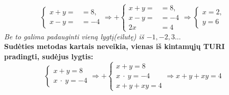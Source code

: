 \documentclass[fleqn]{article} %
\begin{document}
\begin{equation}
    \begin{cases}
        x + y = &= 8, \\
        x - y = &= -4
    \end{cases}
    \Rightarrow +
    \begin{cases}
        x + y = &= 8, \\
        x - y = &= -4 \\
        \hline
        2x &= 4 
    \end{cases}
    \Rightarrow
    \begin{cases}
        x = 2, \\
        y = 6
    \end{cases}
\end{equation}
\textit{Be to galima padauginti vieną lygtį(eilutę) iš $-1, -2, 3 \dots$} \\
\textbf{Sudėties metodas kartais neveikia, vienas iš kintamųjų TURI pradingti, sudėjus lygtis:}
\begin{equation}
    \begin{cases}
        x + y = 8 \\
        x\ \cdot\ y = -4  
    \end{cases}
    \Rightarrow +
    \begin{cases}
        x + y = 8 \\
        x\ \cdot\ y = -4 \\
        \hline
        x + y + xy = 4
    \end{cases}
    \Rightarrow
    x + y + xy = 4
\end{equation}
\end{document}
